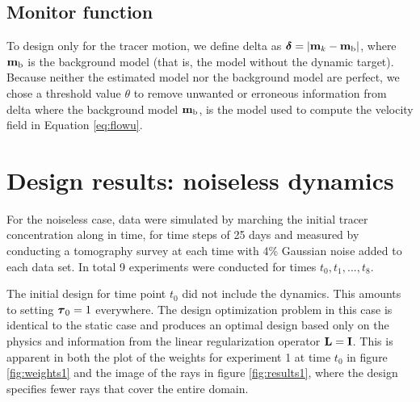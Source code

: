 \documentclass[final,leqno,onefignum,onetabnum]{siamltexmm}
\begin{document}
\subsection{Monitor function}
To design only for the tracer motion, we define delta as ${ \boldsymbol \delta} = |{\bf{m}}_{k} -{\bf{m}}_{\text{b}}|$,
where ${\bf{m}}_{\rm b}$ is the background model (that is, the model without the dynamic target).
 Because  neither the estimated model nor the background model are perfect, we  chose a threshold value $\theta$ to remove unwanted or erroneous information from delta 
where the background model ${\bf{m}}_{\text{b}} $, is the model used to compute the velocity field in Equation \eqref{eq:flowu}.
%
%
%
\section{Design results: noiseless dynamics}
\label{sec:Results}
For the noiseless case, data were simulated by marching  the initial tracer concentration along in time, for time steps of 25 days and measured by conducting a tomography survey at each time with 4\% Gaussian noise added to each data set. In total 9 experiments were conducted for times $t_0,t_1,...,t_8$. 


The initial design for time point $t_0$ did not include the dynamics. This amounts to  setting ${\boldsymbol \tau}_0 = 1$ everywhere. The design optimization problem in this case is  identical to the static case and produces an optimal design based only on the physics and information from the linear regularization operator ${\bf{L}} = {\bf{I}}$. This is apparent in both the plot of the weights for experiment 1 at time  $t_0$ in figure \ref{fig:weights1} and the image of the rays in figure \ref{fig:results1}, where the design specifies fewer rays that cover the entire domain. 
\end{document}
